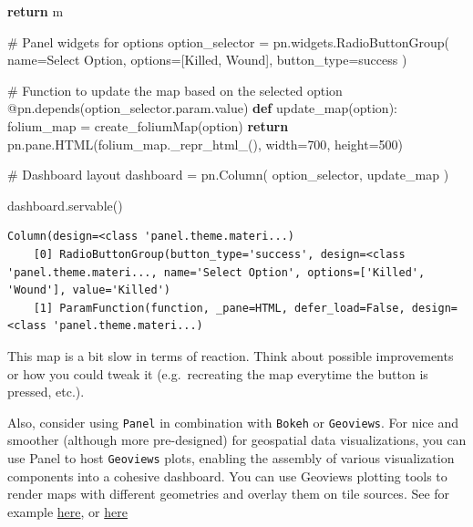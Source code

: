 \documentclass[
  letterpaper,
  DIV=11,
  numbers=noendperiod]{scrreprt}
\newenvironment{Shaded}{\begin{snugshade}}{\end{snugshade}}
\newcommand{\AttributeTok}[1]{\textcolor[rgb]{0.40,0.45,0.13}{#1}}
\newcommand{\CommentTok}[1]{\textcolor[rgb]{0.37,0.37,0.37}{#1}}
\newcommand{\ControlFlowTok}[1]{\textcolor[rgb]{0.00,0.23,0.31}{\textbf{#1}}}
\newcommand{\DecValTok}[1]{\textcolor[rgb]{0.68,0.00,0.00}{#1}}
\newcommand{\KeywordTok}[1]{\textcolor[rgb]{0.00,0.23,0.31}{\textbf{#1}}}
\newcommand{\NormalTok}[1]{\textcolor[rgb]{0.00,0.23,0.31}{#1}}
\newcommand{\OperatorTok}[1]{\textcolor[rgb]{0.37,0.37,0.37}{#1}}
\newcommand{\StringTok}[1]{\textcolor[rgb]{0.13,0.47,0.30}{#1}}
\begin{document}
\begin{Shaded}
\begin{Highlighting}[]
    \ControlFlowTok{return}\NormalTok{ m}

\CommentTok{\# Panel widgets for options}
\NormalTok{option\_selector }\OperatorTok{=}\NormalTok{ pn.widgets.RadioButtonGroup(}
\NormalTok{    name}\OperatorTok{=}\StringTok{\textquotesingle{}Select Option\textquotesingle{}}\NormalTok{, }
\NormalTok{    options}\OperatorTok{=}\NormalTok{[}\StringTok{\textquotesingle{}Killed\textquotesingle{}}\NormalTok{, }\StringTok{\textquotesingle{}Wound\textquotesingle{}}\NormalTok{], }
\NormalTok{    button\_type}\OperatorTok{=}\StringTok{\textquotesingle{}success\textquotesingle{}}
\NormalTok{)}
\end{Highlighting}
\end{Shaded}

\begin{Shaded}
\begin{Highlighting}[]
\CommentTok{\# Function to update the map based on the selected option}
\AttributeTok{@pn.depends}\NormalTok{(option\_selector.param.value)}
\KeywordTok{def}\NormalTok{ update\_map(option):}
\NormalTok{    folium\_map }\OperatorTok{=}\NormalTok{ create\_foliumMap(option)}
    \ControlFlowTok{return}\NormalTok{ pn.pane.HTML(folium\_map.\_repr\_html\_(), width}\OperatorTok{=}\DecValTok{700}\NormalTok{, height}\OperatorTok{=}\DecValTok{500}\NormalTok{)}

\CommentTok{\# Dashboard layout}
\NormalTok{dashboard }\OperatorTok{=}\NormalTok{ pn.Column(}
\NormalTok{    option\_selector,}
\NormalTok{    update\_map}
\NormalTok{)}

\NormalTok{dashboard.servable()}
\end{Highlighting}
\end{Shaded}

\begin{verbatim}
Column(design=<class 'panel.theme.materi...)
    [0] RadioButtonGroup(button_type='success', design=<class 'panel.theme.materi..., name='Select Option', options=['Killed', 'Wound'], value='Killed')
    [1] ParamFunction(function, _pane=HTML, defer_load=False, design=<class 'panel.theme.materi...)
\end{verbatim}

This map is a bit slow in terms of reaction. Think about possible
improvements or how you could tweak it (e.g.~recreating the map
everytime the button is pressed, etc.).

Also, consider using \texttt{Panel} in combination with \texttt{Bokeh}
or \texttt{Geoviews}. For nice and smoother (although more pre-designed)
for geospatial data visualizations, you can use Panel to host
\texttt{Geoviews} plots, enabling the assembly of various visualization
components into a cohesive dashboard. You can use Geoviews plotting
tools to render maps with different geometries and overlay them on tile
sources. See for example
\href{https://dmnfarrell.github.io/bioinformatics/bokeh-maps}{here}, or
\href{https://medium.com/@patohara60/interactive-mapping-in-python-with-uk-census-data-using-geoviews-and-panel-fcba3de07778}{here}
\end{document}
